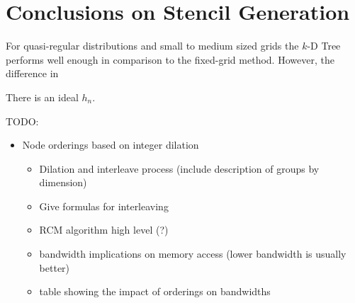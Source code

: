 \documentclass{report}
\begin{document}
\section{Conclusions on Stencil Generation}

For quasi-regular distributions and small to medium sized grids the $k$-D Tree performs well enough in comparison to the fixed-grid method. However, the difference in 

There is an ideal $h_n$. %


TODO: 
\begin{itemize} 
\item Node orderings based on integer dilation
\begin{itemize} 
\item Dilation and interleave process (include description of groups by dimension)
\item Give formulas for interleaving
\item RCM algorithm high level (?)
\item bandwidth implications on memory access (lower bandwidth is usually better)
\item table showing the impact of orderings on bandwidths
\end{itemize} 
\end{itemize}


\ifstandalone


\end{document}
